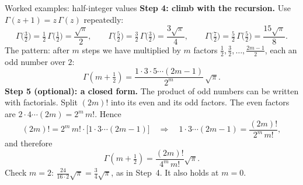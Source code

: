 \documentclass[11pt]{beamer}
\begin{document}
\begin{frame}[allowframebreaks=1.00]{Worked examples: half-integer values}
\textbf{Step 4: climb with the recursion.} Use \(\Gamma(z+1)=z\,\Gamma(z)\) repeatedly:
\[
 \Gamma\bigl(\tfrac32\bigr)=\tfrac12\,\Gamma\bigl(\tfrac12\bigr)=\frac{\sqrt\pi}{2},\qquad
 \Gamma\bigl(\tfrac52\bigr)=\tfrac32\,\Gamma\bigl(\tfrac32\bigr)=\frac{3\sqrt\pi}{4},\qquad
 \Gamma\bigl(\tfrac72\bigr)=\tfrac52\,\Gamma\bigl(\tfrac52\bigr)=\frac{15\sqrt\pi}{8}.
\]
The pattern: after \(m\) steps we have multiplied by \(m\) factors \(\tfrac12,\tfrac32,\dots,\tfrac{2m-1}2\),
each an odd number over \(2\):
\[
 \Gamma\left(m+\tfrac12\right)
 =\frac{1\cdot3\cdot5\cdots(2m-1)}{2^m}\,\sqrt\pi .
\]
\textbf{Step 5 (optional): a closed form.} The product of odd numbers can be written with
factorials. Split \((2m)!\) into its even and its odd factors. The even factors are
\(2\cdot4\cdots(2m)=2^m\,m!\). Hence
\[
 (2m)!=2^m\,m!\cdot\bigl[1\cdot3\cdots(2m-1)\bigr]
 \quad\Longrightarrow\quad
 1\cdot3\cdots(2m-1)=\frac{(2m)!}{2^m\,m!},
\]
and therefore
\[
 \Gamma\left(m+\tfrac12\right)=\frac{(2m)!}{4^m\,m!}\sqrt\pi .
\]
Check \(m=2\): \(\frac{24}{16\cdot2}\sqrt\pi=\frac34\sqrt\pi\), as in Step~4. It also holds at \(m=0\).
\end{frame}
\end{document}
